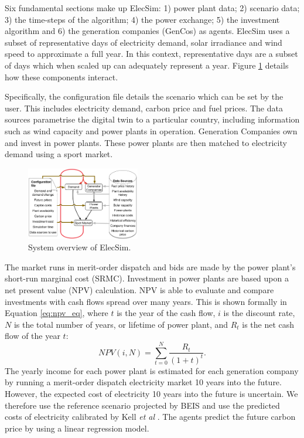 \documentclass[sigconf]{acmart}
\begin{document}
Six fundamental sections make up ElecSim: 1) power plant data; 2) scenario data; 3) the time-steps of the algorithm; 4) the power exchange; 5) the investment algorithm and 6) the generation companies (GenCos) as agents. ElecSim uses a subset of representative days of electricity demand, solar irradiance and wind speed to approximate a full year. In this context, representative days are a subset of days which when scaled up can adequately represent a year. Figure \ref{fig:model_details} details how these components interact. 

Specifically, the configuration file details the scenario which can be set by the user. This includes electricity demand, carbon price and fuel prices. The data sources parametrise the digital twin to a particular country, including information such as wind capacity and power plants in operation. Generation Companies own and invest in power plants. These power plants are then matched to electricity demand using a sport market.

\begin{figure}
\centering
\includegraphics[width=0.44\textwidth]{figures/setup/System_overview_large.png}
\caption{System overview of ElecSim.}
\label{fig:model_details}
\end{figure}

The market runs in merit-order dispatch and bids are made by the power plant's short-run marginal cost (SRMC). Investment in power plants are based upon a net present value (NPV) calculation. NPV is able to evaluate and compare investments with cash flows spread over many years. This is shown formally in Equation \ref{eq:npv_eq}, where $t$ is the year of the cash flow, $i$ is the discount rate, $N$ is the total number of years, or lifetime of power plant, and $R_t$ is the net cash flow of the year $t$:
\begin{equation} \label{eq:npv_eq}
NPV(i, N) = \sum_{t=0}^{N}\frac{R_t}{(1+t)^t}.
\end{equation}
The yearly income for each power plant is estimated for each generation company by running a merit-order dispatch electricity market 10 years into the future. However, the expected cost of electricity 10 years into the future is uncertain. We therefore use the reference scenario projected by BEIS and use the predicted costs of electricity calibrated by Kell \textit{et al} \cite{DBEIS2019, Kell2020}. The agents predict the future carbon price by using a linear regression model.
\end{document}
